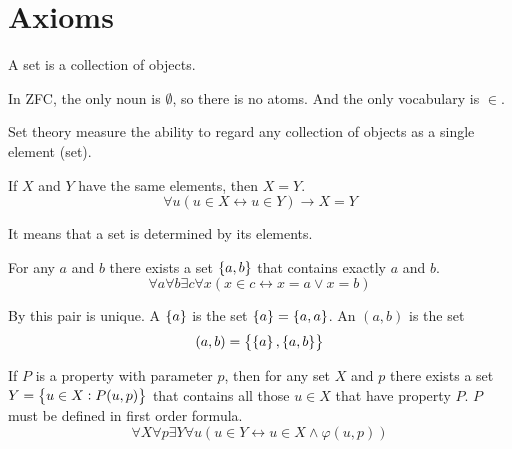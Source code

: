 \section{Axioms}

\begin{definition}
    A set is a collection of objects.
\end{definition}

In ZFC, the only noun is $\emptyset$, so there is no atoms. And the only vocabulary is $\in$.

Set theory measure the ability to regard any collection of objects as a single element (set).

\begin{axiom}\label{axiomofextensionality}
    If $X$ and $Y$ have the same elements, then $X=Y$.
    \begin{equation}
        \forall u (u \in X \leftrightarrow u \in Y ) \rightarrow X = Y
    \end{equation}
\end{axiom}

It means that a set is determined by its elements.

\begin{axiom}
    For any $a$ and $b$ there exists a set $\set{a,b}$ that contains exactly $a$ and $b$.
    \begin{equation}
        \forall a \forall b \exists c \forall x (x \in c \leftrightarrow x = a \vee x = b )
    \end{equation}
\end{axiom}

By  this pair is unique. A  $\set{a}$ is the set $\set{a} = \set{a, a}$. An  $(a,b)$ is the set 
    \begin{equation}
        (a,b) = \set{\set{a}, \set{a,b}}
    \end{equation}



\begin{axiom}
    If $P$ is a property with parameter $p$, then for any set $X$ and $p$ there exists a set $Y = \set{u \in X: P(u,p)}$ that contains all those $u \in X$ that have property $P$. $P$ must be defined in first order formula.
    \begin{equation}
        \forall X \forall p \exists Y \forall u \left(u \in Y \leftrightarrow u \in X \wedge \varphi(u, p) \right)
    \end{equation}    
\end{axiom}

